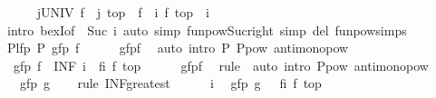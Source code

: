 \begin{isabellebody}
\ \ \ \ \isamarkupfalse%
\ {\isachardoublequoteopen}{\isasymexists}j{\isasymin}UNIV{\isachardot}\ {\isacharparenleft}f\ {\isacharcircum}{\isacharcircum}\ j{\isacharparenright}\ top\ {\isasymle}\ {\isacharparenleft}f\ {\isacharcircum}{\isacharcircum}\ i{\isacharparenright}\ {\isacharparenleft}f\ top{\isacharparenright}{\isachardoublequoteclose}\ \ i\isanewline
\ \ \ \ \ \ \isamarkupfalse%
\ {\isacharparenleft}intro\ bexI{\isacharbrackleft}of\ {\isacharunderscore}\ {\isachardoublequoteopen}Suc\ i{\isachardoublequoteclose}{\isacharbrackright}{\isacharparenright}\ {\isacharparenleft}auto\ simp{\isacharcolon}\ funpow{\isacharunderscore}Suc{\isacharunderscore}right\ simp\ del{\isacharcolon}\ funpow{\isachardot}simps{\isacharparenleft}{}{\isacharparenright}{\isacharparenright}\isanewline
\ \ \isamarkupfalse%
\isanewline
\isanewline
\ \ \isamarkupfalse%
\ P{\isacharunderscore}lfp{\isacharcolon}\ {\isachardoublequoteopen}P\ {\isacharparenleft}gfp\ f{\isacharparenright}{\isachardoublequoteclose}\isanewline
\ \ \ \ \isamarkupfalse%
\ gfp{\isacharunderscore}f\ \isamarkupfalse%
\ {\isacharparenleft}auto\ intro{\isacharbang}{\isacharcolon}\ P\ P{\isacharunderscore}pow\ antimono{\isacharunderscore}pow{}{\isacharparenright}\isanewline
\isanewline
\ \ \isamarkupfalse%
\ {\isachardoublequoteopen}{\isasymalpha}\ {\isacharparenleft}gfp\ f{\isacharparenright}\ {\isacharequal}\ {\isacharparenleft}INF\ i{\isachardot}\ {\isasymalpha}\ {\isacharparenleft}{\isacharparenleft}f{\isacharcircum}{\isacharcircum}i{\isacharparenright}\ {\isacharparenleft}f\ top{\isacharparenright}{\isacharparenright}{\isacharparenright}{\isachardoublequoteclose}\isanewline
\ \ \ \ \isamarkupfalse%
\ gfp{\isacharunderscore}f\ \isamarkupfalse%
\ {\isacharparenleft}rule\ {\isasymalpha}{\isacharparenright}\ {\isacharparenleft}auto\ intro{\isacharbang}{\isacharcolon}\ P{\isacharunderscore}pow\ antimono{\isacharunderscore}pow{}{\isacharparenright}\isanewline
\ \ \isamarkupfalse%
\ \isamarkupfalse%
\ {\isachardoublequoteopen}{\isasymdots}\ {\isasymge}\ gfp\ g{\isachardoublequoteclose}\isanewline
\ \ \isamarkupfalse%
\ {\isacharparenleft}rule\ INF{\isacharunderscore}greatest{\isacharparenright}\isanewline
\ \ \ \ \isamarkupfalse%
\ i\ \isamarkupfalse%
\ {\isachardoublequoteopen}gfp\ g\ {\isasymle}\ {\isasymalpha}\ {\isacharparenleft}{\isacharparenleft}f{\isacharcircum}{\isacharcircum}i{\isacharparenright}\ {\isacharparenleft}f\ top{\isacharparenright}{\isacharparenright}{\isachardoublequoteclose}\isanewline

\end{isabellebody}
